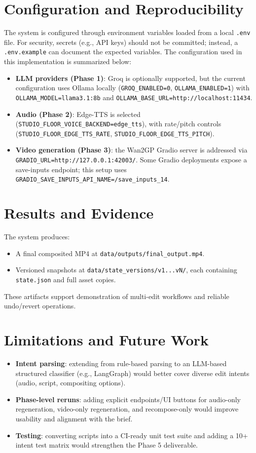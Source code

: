 \documentclass[runningheads]{llncs}
\begin{document}
\section{Configuration and Reproducibility}
The system is configured through environment variables loaded from a local \texttt{.env} file. For security, secrets (e.g., API keys) should not be committed; instead, a \texttt{.env.example} can document the expected variables. The configuration used in this implementation is summarized below:
\begin{itemize}
  \item \textbf{LLM providers (Phase 1)}: Groq is optionally supported, but the current configuration uses Ollama locally (\texttt{GROQ\_ENABLED=0}, \texttt{OLLAMA\_ENABLED=1}) with \texttt{OLLAMA\_MODEL=llama3.1:8b} and \texttt{OLLAMA\_BASE\_URL=http://localhost:11434}.
  \item \textbf{Audio (Phase 2)}: Edge-TTS is selected (\texttt{STUDIO\_FLOOR\_VOICE\_BACKEND=edge\_tts}), with rate/pitch controls (\texttt{STUDIO\_FLOOR\_EDGE\_TTS\_RATE}, \texttt{STUDIO\_FLOOR\_EDGE\_TTS\_PITCH}).
  \item \textbf{Video generation (Phase 3)}: the Wan2GP Gradio server is addressed via \texttt{GRADIO\_URL=http://127.0.0.1:42003/}. Some Gradio deployments expose a save-inputs endpoint; this setup uses \texttt{GRADIO\_SAVE\_INPUTS\_API\_NAME=/save\_inputs\_14}.
\end{itemize}

\section{Results and Evidence}
The system produces:
\begin{itemize}
  \item A final composited MP4 at \texttt{data/outputs/final\_output.mp4}.
  \item Versioned snapshots at \texttt{data/state\_versions/v1...vN/}, each containing \texttt{state.json} and full asset copies.
\end{itemize}
These artifacts support demonstration of multi-edit workflows and reliable undo/revert operations.

\section{Limitations and Future Work}
\begin{itemize}
  \item \textbf{Intent parsing}: extending from rule-based parsing to an LLM-based structured classifier (e.g., LangGraph) would better cover diverse edit intents (audio, script, compositing options).
  \item \textbf{Phase-level reruns}: adding explicit endpoints/UI buttons for audio-only regeneration, video-only regeneration, and recompose-only would improve usability and alignment with the brief.
  \item \textbf{Testing}: converting scripts into a CI-ready unit test suite and adding a 10+ intent test matrix would strengthen the Phase 5 deliverable.
\end{itemize}
\end{document}
